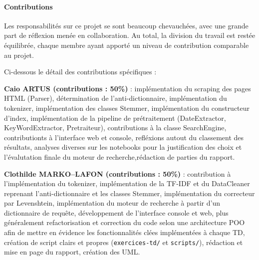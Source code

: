 \paragraph{Contributions}

Les responsabilités sur ce projet se sont beaucoup chevauchées, avec une grande part de réflexion menée en collaboration. Au total, la division du travail est restée équilibrée, chaque membre ayant apporté un niveau de contribution comparable au projet.

Ci-dessous le détail des contributions spécifiques :

\textbf{Caio ARTUS (contributions : 50\%)} : implémentation du scraping des pages HTML (Parser), détermination de l'anti-dictionnaire, implémentation du tokenizer, implémentation des classes Stemmer, implémentation du constructeur d'index, implémentation de la pipeline de prétraitement (DateExtractor, KeyWordExtractor, Pretraiteur), contributions à la classe SearchEngine, contributionts à l'interface web et console, refléxions autout du classement des résultats, analyses diverses sur les notebooks pour la justification des choix et l'évalutation finale du moteur de recherche,rédaction de parties du rapport.

\textbf{Clothilde MARKO--LAFON (contributions : 50\%)} : contribution à l'implémentation du tokenizer, implémentation de la TF-IDF et du DataCleaner reprenant l'anti-dictionnaire et les classes Stemmer, implémentation du correcteur par Levenshtein, implémentation du moteur de recherche à partir d'un dictionnaire de requête, développement de l'interface console et web, plus généralement refactorisation et correction du code selon une architecture POO afin de mettre en évidence les fonctionnalités clées implémentées à chaque TD, création de script clairs et propres (\texttt{exercices-td/} et \texttt{scripts/}), rédaction et mise en page du rapport, création des UML.